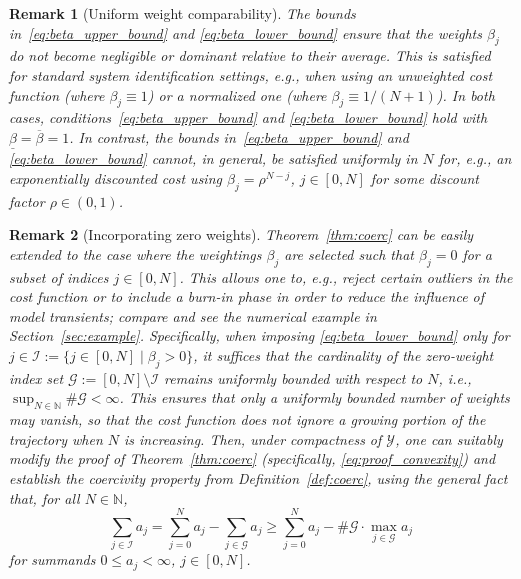\documentclass[a4paper,fleqn]{cas-dc}
\newtheorem{rem}{Remark}
\begin{document}
\begin{rem}[Uniform weight comparability]\label{rem:beta}
	The bounds in~\eqref{eq:beta_upper_bound} and \eqref{eq:beta_lower_bound} ensure that the weights $\beta_j$ do not become negligible or dominant relative to their average.
	This is satisfied for standard system identification settings, e.g., when using an unweighted cost function (where $\beta_j\equiv1$) or a normalized one (where $\beta_j\equiv 1/(N+1)$).
	In both cases, conditions~\eqref{eq:beta_upper_bound} and \eqref{eq:beta_lower_bound} hold with $\underline{\beta}=\overline{\beta}=1$.
	In contrast, the bounds in~\eqref{eq:beta_upper_bound} and \eqref{eq:beta_lower_bound} cannot, in general, be satisfied uniformly in $N$ for, e.g., an exponentially discounted cost using $\beta_j=\rho^{N-j}$, $j\in[0,N]$ for some discount factor $\rho\in(0,1)$.
\end{rem}

\begin{rem}[Incorporating zero weights]\label{rem:burn_in}
	Theorem~\ref{thm:coerc} can be easily extended to the case where the weightings $\beta_j$ are selected such that $\beta_j=0$ for a subset of indices $j\in[0,N]$. This allows one to, e.g., reject certain outliers in the cost function or to include a burn-in phase in order to reduce the influence of model transients; compare \cite{Schiller2025b,Jaeger2002,Bonassi2022} and see the numerical example in Section~\ref{sec:example}.
	Specifically, when imposing \eqref{eq:beta_lower_bound} only for $j\in\mathcal{I}:=\{j\in[0,N] \mid \beta_j>0\}$, it suffices that the cardinality of the zero-weight index set $\mathcal{G} := [0,N]\setminus \mathcal{I}$ remains uniformly bounded with respect to $N$, i.e., $\sup_{N\in\mathbb N}\#\mathcal{G}<\infty$.
	This ensures that only a uniformly bounded number of weights may vanish, so that the cost function does not ignore a growing portion of the trajectory when $N$ is increasing.
	Then, under compactness of $\mathcal{Y}$, one can suitably modify the proof of Theorem~\ref{thm:coerc} (specifically, \eqref{eq:proof_convexity}) and establish the coercivity property from Definition~\ref{def:coerc}, using the general fact that, for all $N\in\mathbb{N}$,
	\begin{equation*}
		\sum_{j\in\mathcal{I}} a_j=  \sum_{j=0}^N a_j - \sum_{j\in\mathcal{G}} a_j\geq \sum_{j=0}^N a_j -\#\mathcal{G}\cdot \max_{j\in\mathcal{G}}a_j
	\end{equation*}
	for summands $0\leq a_j<\infty$, $j\in[0,N]$.
\end{rem}
\end{document}
